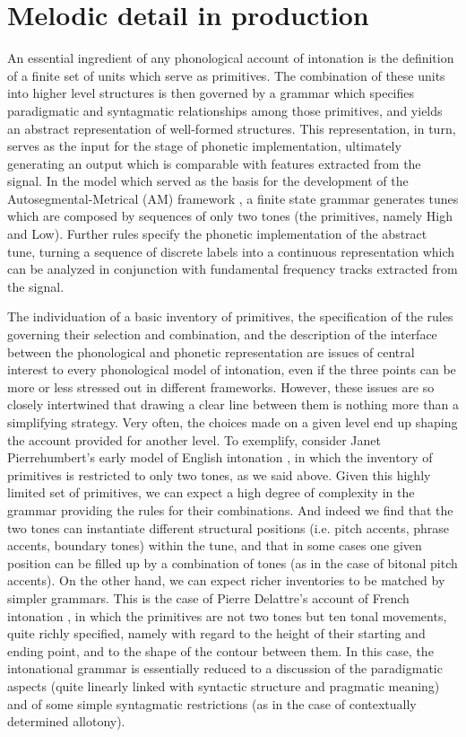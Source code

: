 \chapter[Melodic detail in production]{Melodic detail in production}\label{sec2}
An essential ingredient of any phonological account of intonation is the definition of a finite set of units which serve as primitives. The combination of these units into higher level structures is then governed by a grammar which specifies paradigmatic and syntagmatic relationships among those primitives, and yields an abstract representation of well-formed structures. This representation, in turn, serves as the input for the stage of phonetic implementation, ultimately generating an output which is comparable with features extracted from the signal. In the model which served as the basis for the development of the Autosegmental-Metrical (AM) framework \cite[10]{pierrehumbert1980phonology}, a finite state grammar generates tunes which are composed by sequences of only two tones (the primitives, namely High and Low). Further rules specify the phonetic implementation of the abstract tune, turning a sequence of discrete labels into a continuous representation which can be analyzed in conjunction with fundamental frequency tracks extracted from the signal.

The individuation of a basic inventory of primitives, the specification of the rules governing their selection and combination, and the description of the interface between the phonological and phonetic representation are issues of central interest to every phonological model of intonation, even if the three points can be more or less stressed out in different frameworks. However, these issues are so closely intertwined that drawing a clear line between them is nothing more than a simplifying strategy. Very often, the choices made on a given level end up shaping the account provided for another level. To exemplify, consider Janet Pierrehumbert's early model of English intonation \cite[29]{pierrehumbert1980phonology}, in which the inventory of primitives is restricted to only two tones, as we said above. Given this highly limited set of primitives, we can expect a high degree of complexity in the grammar providing the rules for their combinations. And indeed we find that the two tones can instantiate different structural positions (i.e. pitch accents, phrase accents, boundary tones) within the tune, and that in some cases one given position can be filled up by a combination of tones (as in the case of bitonal pitch accents). On the other hand, we can expect richer inventories to be matched by simpler grammars. This is the case of Pierre Delattre's account of French intonation \citep{delattre1966dix}, in which the primitives are not two tones but ten tonal movements, quite richly specified, namely with regard to the height of their starting and ending point, and to the shape of the contour between them. In this case, the intonational grammar is essentially reduced to a discussion of the paradigmatic aspects (quite linearly linked with syntactic structure and pragmatic meaning) and of some simple syntagmatic restrictions (as in the case of contextually determined allotony).

